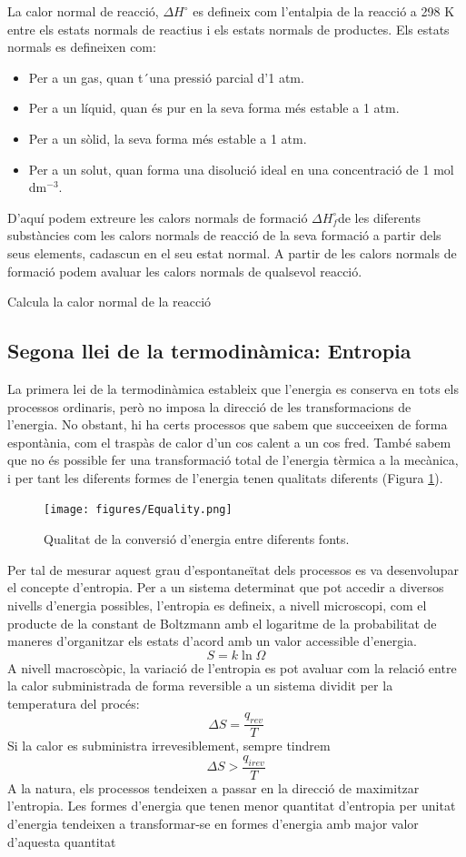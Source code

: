La calor normal de reacció, $\Delta H^{\circ}$ es defineix com l'entalpia de la reacció a 298 K entre els estats normals de reactius i els estats normals de productes.
Els estats normals es defineixen com:
\begin{itemize}
\item Per a un gas, quan t´una pressió parcial d'1 atm.
\item Per a un líquid, quan és pur en la seva forma més estable a 1 atm.
\item Per a un sòlid, la seva forma més estable a 1 atm.
\item Per a un solut, quan forma una disolució ideal en una concentració de 1 mol dm$^{-3}$.
\end{itemize}
D'aquí podem extreure les calors normals de formació $\Delta H_f^{\circ}$de les diferents substàncies com les calors normals de reacció de la seva formació a partir dels seus elements, cadascun en el seu estat normal.
A partir de les calors normals de formació podem avaluar les calors normals de qualsevol reacció.
\begin{exr}
Calcula la calor normal de la reacció 
\end{exr}

\subsection{Segona llei de la termodinàmica: Entropia}

La primera lei de la termodinàmica estableix que l'energia es conserva en tots els processos ordinaris, però no imposa la direcció de les transformacions de l'energia.
No obstant, hi ha certs processos que sabem que succeeixen de forma espontània, com el traspàs de calor d'un cos calent a un cos fred.
També sabem que no és possible fer una transformació total de l'energia tèrmica a la mecànica, i per tant les diferents formes de l'energia tenen qualitats diferents (Figura \ref{fig:Equality}).
\begin{figure}[h]
\centering
\texttt{[image: figures/Equality.png]}
\caption{Qualitat de la conversió d'energia entre diferents fonts.\cite{yen_chemistry_2008}}
\label{fig:Equality}
\end{figure}

Per tal de mesurar aquest grau d'espontaneïtat dels processos es va desenvolupar el concepte d'entropia. Per a un sistema determinat que pot accedir a diversos nivells d'energia possibles, l'entropia es defineix, a nivell microscopi, com el producte de la constant de Boltzmann amb el logaritme de la probabilitat de maneres d'organitzar els estats d'acord amb un valor accessible d'energia.
\[
S=k \ln \Omega
\]
A nivell macroscòpic, la variació de l'entropia es pot avaluar com la relació entre la calor subministrada de forma reversible a un sistema dividit per la temperatura del procés:
\[
\Delta S = \frac{q_{rev}}{T}
\]
Si la calor es subministra irrevesiblement, sempre tindrem 
\[
\Delta S > \frac{q_{irev}}{T}
\]
A la natura, els processos tendeixen a passar en la direcció de maximitzar l'entropia.
Les formes d'energia que tenen menor quantitat d'entropia per unitat d'energia tendeixen a transformar-se en formes d'energia amb major valor d'aquesta quantitat

